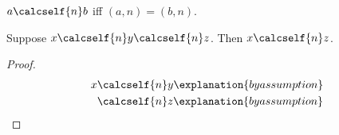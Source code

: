 

\begin{abbreviation}\label{calculation_self_relation}
    $a\calcself{n}b$ iff $(a,n)=(b,n)$.
\end{abbreviation}

\begin{composition}\label{calculation_self_registration}
    Suppose $x\calcself{n}y\calcself{n}z$.
    Then $x\calcself{n}z$.
\end{composition}
\begin{proof}
    \begin{align*}
        x
            &\calcself{n} y
                \explanation{by assumption}
                \\
            &\calcself{n} z
                \explanation{by assumption}
    \end{align*}
\end{proof}
